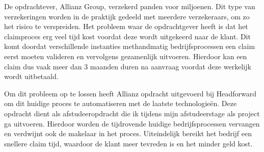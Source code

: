 De opdrachtever, Allianz Group, verzekerd panden voor miljoenen. Dit type van verzekeringen worden in de praktijk gedeeld met meerdere verzekeraars, om zo het risico te verspreiden. Het probleem waar de opdrachtgever heeft is dat het claimproces erg veel tijd kost voordat deze wordt uitgekeerd naar de klant. Dit komt doordat verschillende instanties methandmatig bedrijfsprocessen een claim eerst moeten valideren en vervolgens gezamenlijk uitvoeren. Hierdoor kan een claim dus vaak meer dan 3 maanden duren na aanvraag voordat deze werkelijk wordt uitbetaald.

Om dit probleem op te lossen heeft Allianz opdracht uitgevoerd bij Headforward om dit huidige proces te automatiseren met de laatste technologieën. Deze opdracht dient als afstudeeropdracht die ik tijdens mijn afstudeerstage als project ga uitvoeren. Hierdoor worden de tijdrovende huidige bedrijfsprocessen vervangen en verdwijnt ook de makelaar in het proces. Uiteindelijk bereikt het bedrijf een snellere claim tijd, waardoor de klant meer tevreden is en het minder geld kost.